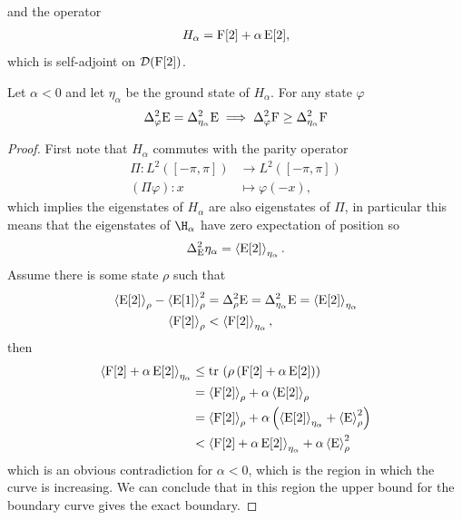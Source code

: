 and the operator
\begin{align}
  H_\alpha = \operatorname{F}[2] + \alpha\operatorname{E}[2],
\end{align}
which is self-adjoint on $\mathcal{D}(\operatorname{F}[2])$.
\begin{lem}
  Let $\alpha < 0$ and let $\eta_\alpha$ be the ground state of $H_\alpha$. For any state $\varphi$
  \begin{align}
    \var[\varphi]{\ope} = \var[\eta_\alpha]{\ope} \implies \var[\varphi]{\opf} \geq \var[\eta_\alpha]{\opf}
  \end{align}
\end{lem}
\begin{proof}
First note that $H_\alpha$ commutes with the parity operator 
\begin{align}
  \Pi: L^2([-\pi,\pi]) &\to L^2([-\pi,\pi])\\
  (\Pi \varphi):x &\mapsto \varphi(-x),
\end{align}
which implies the eigenstates of $H_\alpha$ are also eigenstates of $\Pi$, in particular this means that the eigenstates of $\H_\alpha$ have zero expectation of position so
\begin{align}
  \var[\ope]{\eta_\alpha} = \expe{\ope[2]}{\eta_\alpha}.
\end{align}
Assume there is some state $\rho$ such that
\begin{align}
	\expe{\ope[2]}{\rho} - \expe{\ope[1]}{\rho}^2 &= \var[\rho]{\ope} = \var[\eta_\alpha]{\ope} = \expe{\ope[2]}{\eta_\alpha}\\
	\expe{\opf[2]}{\rho} &< \expe{\opf[2]}{\eta_\alpha},
\end{align}
then
\begin{align}
	\expe{\opf[2] +\alpha\ope[2]}{\eta_\alpha} &\leq \tr{\rho\left(\opf[2] +\alpha\ope[2]\right)}\\
	&= \expe{\opf[2]}{\rho} + \alpha\expe{\ope[2]}{\rho}\\
	&= \expe{\opf[2]}{\rho} + \alpha\left(\expe{\ope[2]}{\eta_\alpha} + \expe{\ope}{\rho}^2\right)\\
	&< \expe{\opf[2] + \alpha\ope[2]}{\eta_\alpha} + \alpha\expe{\ope}{\rho}^2
\end{align}
which is an obvious contradiction for $\alpha < 0$, which is the region in which the curve is increasing. We can conclude that in this region the upper bound for the boundary curve gives the exact boundary. 
\end{proof}

